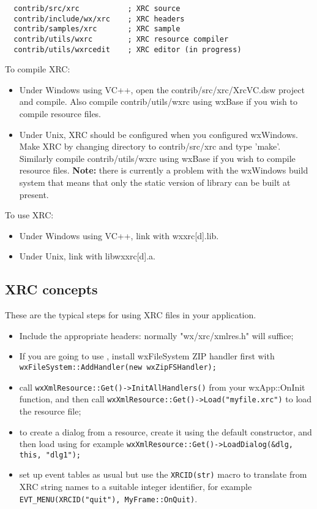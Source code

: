 \begin{verbatim}
  contrib/src/xrc           ; XRC source
  contrib/include/wx/xrc    ; XRC headers
  contrib/samples/xrc       ; XRC sample
  contrib/utils/wxrc        ; XRC resource compiler
  contrib/utils/wxrcedit    ; XRC editor (in progress)
\end{verbatim}

To compile XRC:

\begin{itemize}\itemsep=0pt
\item Under Windows using VC++, open the contrib/src/xrc/XrcVC.dsw project
and compile. Also compile contrib/utils/wxrc using wxBase if you wish to compile
resource files.
\item Under Unix, XRC should be configured when you configured
wxWindows. Make XRC by changing directory to contrib/src/xrc and
type 'make'.  Similarly compile contrib/utils/wxrc using wxBase if you wish to compile
resource files. {\bf Note:} there is currently a
problem with the wxWindows build system that means that
only the static version of library can be built at present.
\end{itemize}

To use XRC:

\begin{itemize}\itemsep=0pt
\item Under Windows using VC++, link with wxxrc[d].lib.
\item Under Unix, link with libwxxrc[d].a.
\end{itemize}

\subsection{XRC concepts}\label{xrcconcepts}

These are the typical steps for using XRC files in your application.

\begin{itemize}\itemsep=0pt
\item Include the appropriate headers: normally "wx/xrc/xmlres.h" will suffice;
\item If you are going to use , install
wxFileSystem ZIP handler first with {\tt wxFileSystem::AddHandler(new wxZipFSHandler);}
\item call {\tt wxXmlResource::Get()->InitAllHandlers()} from your wxApp::OnInit function,
and then call {\tt wxXmlResource::Get()->Load("myfile.xrc")} to load the resource file;
\item to create a dialog from a resource, create it using the default constructor, and then
load using for example {\tt wxXmlResource::Get()->LoadDialog(\&dlg, this, "dlg1");}
\item set up event tables as usual but use the {\tt XRCID(str)} macro to translate from XRC string names
to a suitable integer identifier, for example {\tt EVT\_MENU(XRCID("quit"), MyFrame::OnQuit)}.
\end{itemize}

